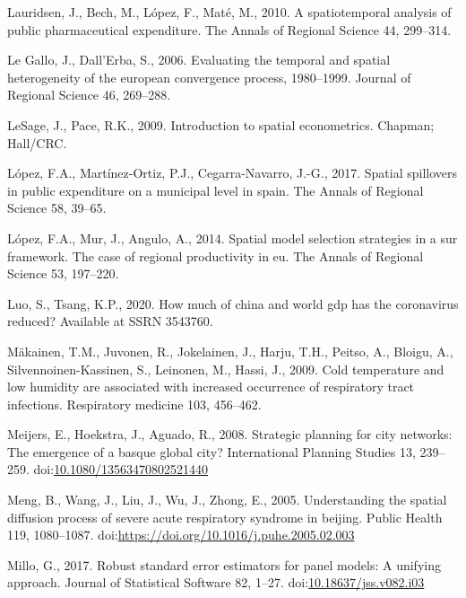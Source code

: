 \documentclass[]{elsarticle} %
\begin{document}
\leavevmode\hypertarget{ref-Lauridsen2010spatiotemporal}{}%
Lauridsen, J., Bech, M., López, F., Maté, M., 2010. A spatiotemporal
analysis of public pharmaceutical expenditure. The Annals of Regional
Science 44, 299--314.

\leavevmode\hypertarget{ref-Legallo2006evaluating}{}%
Le Gallo, J., Dall'Erba, S., 2006. Evaluating the temporal and spatial
heterogeneity of the european convergence process, 1980--1999. Journal
of Regional Science 46, 269--288.

\leavevmode\hypertarget{ref-LeSage2009introduction}{}%
LeSage, J., Pace, R.K., 2009. Introduction to spatial econometrics.
Chapman; Hall/CRC.

\leavevmode\hypertarget{ref-Lopez2017spatial}{}%
López, F.A., Martínez-Ortiz, P.J., Cegarra-Navarro, J.-G., 2017. Spatial
spillovers in public expenditure on a municipal level in spain. The
Annals of Regional Science 58, 39--65.

\leavevmode\hypertarget{ref-Lopez2014spatial}{}%
López, F.A., Mur, J., Angulo, A., 2014. Spatial model selection
strategies in a sur framework. The case of regional productivity in eu.
The Annals of Regional Science 53, 197--220.

\leavevmode\hypertarget{ref-Luo2020how}{}%
Luo, S., Tsang, K.P., 2020. How much of china and world gdp has the
coronavirus reduced? Available at SSRN 3543760.

\leavevmode\hypertarget{ref-Makinen2009cold}{}%
Mäkainen, T.M., Juvonen, R., Jokelainen, J., Harju, T.H., Peitso, A.,
Bloigu, A., Silvennoinen-Kassinen, S., Leinonen, M., Hassi, J., 2009.
Cold temperature and low humidity are associated with increased
occurrence of respiratory tract infections. Respiratory medicine 103,
456--462.

\leavevmode\hypertarget{ref-Meijers2008strategic}{}%
Meijers, E., Hoekstra, J., Aguado, R., 2008. Strategic planning for city
networks: The emergence of a basque global city? International Planning
Studies 13, 239--259.
doi:\href{https://doi.org/10.1080/13563470802521440}{10.1080/13563470802521440}

\leavevmode\hypertarget{ref-Meng2005understanding}{}%
Meng, B., Wang, J., Liu, J., Wu, J., Zhong, E., 2005. Understanding the
spatial diffusion process of severe acute respiratory syndrome in
beijing. Public Health 119, 1080--1087.
doi:\href{https://doi.org/https://doi.org/10.1016/j.puhe.2005.02.003}{https://doi.org/10.1016/j.puhe.2005.02.003}

\leavevmode\hypertarget{ref-Millo2017robust}{}%
Millo, G., 2017. Robust standard error estimators for panel models: A
unifying approach. Journal of Statistical Software 82, 1--27.
doi:\href{https://doi.org/10.18637/jss.v082.i03}{10.18637/jss.v082.i03}
\end{document}
